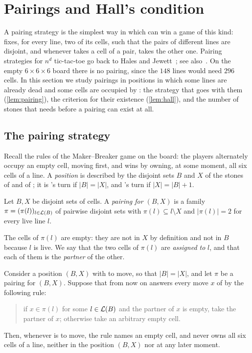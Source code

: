 \section{Pairings and Hall's condition}\label{sec:pairing}

A pairing strategy is the simplest way in which \Breaker{} can win a game of this kind: \Breaker{} fixes,
for every line, two of its cells, such that the pairs of different lines are disjoint, and whenever \Maker{}
takes a cell of a pair, \Breaker{} takes the other one. Pairing strategies for $n^d$ tic-tac-toe go back to
Hales and Jewett~\cite{HalesJewett1963}; see also~\cite{Beck2008,Krivelevich2014}. On the empty $6\times6\times6$ board
there is no pairing, since the $148$ lines would need $296$ cells. In this section we study pairings in
positions in which some lines are already dead and some cells are occupied by \Maker: the strategy that
goes with them (\cref{lem:pairing}), the criterion for their existence (\cref{lem:hall}), and the number
of stones that \Breaker{} needs before a pairing can exist at all.

\subsection{The pairing strategy}\label{ssec:pairing-strategy}

Recall the rules of the Maker--Breaker game on the board: the players alternately occupy an empty cell,
\Maker{} moving first, and \Maker{} wins by owning, at some moment, all six cells of a line. A
\emph{position} is described by the disjoint sets $B$ and $X$ of the stones of \Breaker{} and of \Maker;
it is \Maker's turn if $|B|=|X|$, and \Breaker's turn if $|X|=|B|+1$.

\begin{definition}[Pairing]\label{def:pairing}
Let $B,X$ be disjoint sets of cells. A \emph{pairing for $(B,X)$} is a family $\pi=(\pi(l))_{l\in\mathcal{L}(B)}$
of pairwise disjoint sets with $\pi(l)\subseteq l\setminus X$ and $|\pi(l)|=2$ for every live line $l$.
\end{definition}

The cells of $\pi(l)$ are empty: they are not in $X$ by definition and not in $B$ because $l$ is live.
We say that the two cells of $\pi(l)$ are \emph{assigned to} $l$, and that each of them is the
\emph{partner} of the other.

\begin{lemma}\label{lem:pairing}
Consider a position $(B,X)$ with \Maker{} to move, so that $|B|=|X|$, and let $\pi$ be a pairing for
$(B,X)$. Suppose that from now on \Breaker{} answers every move $x$ of \Maker{} by the following rule:
\begin{quote}
if $x\in\pi(l)$ for some $l\in\mathcal{L}(B)$ and the partner of $x$ is empty, take the partner of $x$;
otherwise take an arbitrary empty cell.
\end{quote}
Then, whenever \Breaker{} is to move, the rule names an empty cell, and \Maker{} never owns all six cells
of a line, neither in the position $(B,X)$ nor at any later moment.
\end{lemma}

